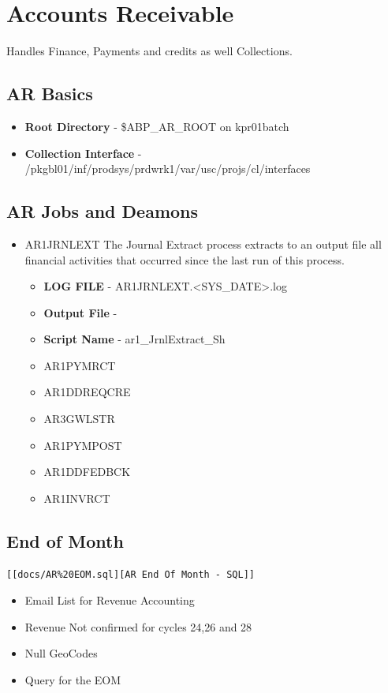 \documentclass[12pt,twoside]{article}
\begin{document}
\section{Accounts Receivable}
\label{sec:orgheadline69}
Handles Finance, Payments and credits as well Collections.
\subsection{AR Basics}
\label{sec:orgheadline61}
\begin{itemize}
\item \textbf{Root Directory} - \$ABP\_AR\_ROOT on kpr01batch
\item \textbf{Collection Interface} -
/pkgbl01/inf/prodsys/prdwrk1/var/usc/projs/cl/interfaces
\end{itemize}

\subsection{AR Jobs and Deamons}
\label{sec:orgheadline62}
\begin{itemize}
\item AR1JRNLEXT
The Journal Extract process extracts to an output file all
  financial activities that occurred since the last run of
  this process.
\begin{itemize}
\item \textbf{LOG FILE} - AR1JRNLEXT.<SYS\_DATE>.log
\item \textbf{Output File} -
\item \textbf{Script Name} - ar1\_JrnlExtract\_Sh
\end{itemize}
\begin{itemize}
\item AR1PYMRCT
\item AR1DDREQCRE
\item AR3GWLSTR
\item AR1PYMPOST
\item AR1DDFEDBCK
\item AR1INVRCT
\end{itemize}
\end{itemize}
\subsection{End of Month}
\label{sec:orgheadline63}
\begin{verbatim}
[[docs/AR%20EOM.sql][AR End Of Month - SQL]]
\end{verbatim}
\begin{itemize}
\item Email List for Revenue Accounting
\item Revenue Not confirmed for cycles 24,26 and 28
\item Null GeoCodes
\item Query for the EOM
\end{itemize}
\end{document}
